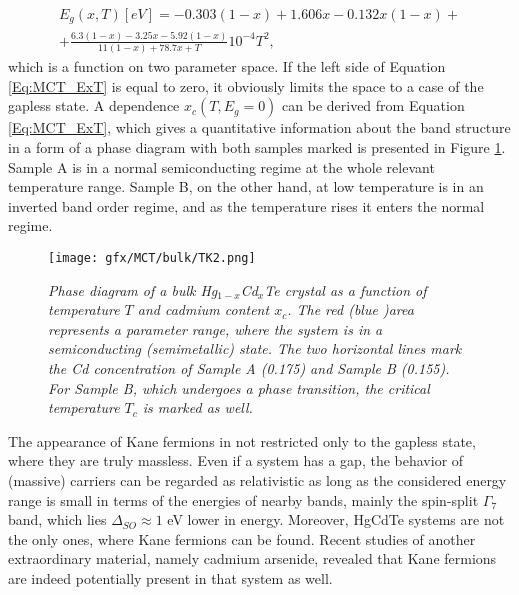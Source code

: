 \documentclass[titlepage,a4paper]{book}
\begin{document}
\begin{equation}
\begin{aligned}
\label{Eq:MCT_ExT}
E_g (x,T)[eV] = -0.303(1-x) + 1.606x - 0.132x(1-x) +\\ +\frac{6.3(1-x)-3.25x-5.92(1-x)}{11(1-x)+78.7x+T}10^{-4}T^2,
\end{aligned}
\end{equation}
which is a function on two parameter space. If the left side of Equation \ref{Eq:MCT_ExT} is equal to zero, it obviously limits the space to a case of the gapless state. A dependence $x_c(T, E_g = 0)$ can be derived from Equation \ref{Eq:MCT_ExT}, which gives a quantitative information about the band structure in a form of a phase diagram with both samples marked is presented in Figure \ref{fig:TK2}. Sample A is in a normal semiconducting regime at the whole relevant temperature range. Sample B, on the other hand, at low temperature is in an inverted band order regime, and as the temperature rises it enters the normal regime. 

\begin{figure}[H]
	\centering
	\texttt{[image: gfx/MCT/bulk/TK2.png]}
	\vspace{-10pt}
	\caption{\textit{Phase diagram of a bulk Hg$_{1-x}$Cd$_x$Te crystal as a function of temperature $T$ and cadmium content $x_c$. The red (blue )area represents a parameter range, where the system is in a semiconducting (semimetallic) state. The two horizontal lines mark the Cd concentration of Sample A (0.175) and Sample B (0.155). For Sample B, which undergoes a phase transition, the critical temperature $T_c$ is marked as well.}}
	\label{fig:TK2}
\end{figure} 

The appearance of Kane fermions in not restricted only to the gapless state, where they are truly massless. Even if a system has a gap, the behavior of (massive) carriers can be regarded as relativistic as long as the considered energy range is small in terms of the energies of nearby bands, mainly the spin-split $\Gamma_7$ band, which lies $\Delta_{SO} \approx 1$ eV \cite{Novik_MCT} lower in energy. Moreover, HgCdTe systems are not the only ones, where Kane fermions can be found. Recent studies of another extraordinary material, namely cadmium arsenide, revealed that Kane fermions are indeed potentially present in that system \cite{Akrap_CdAs} as well.
\end{document}
